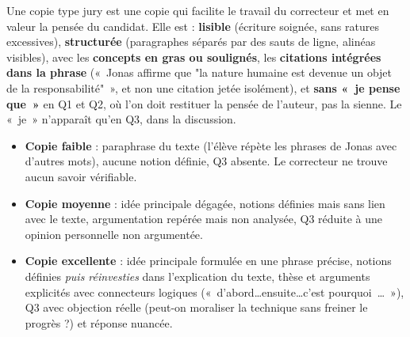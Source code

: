 \documentclass[11pt]{article}
\newcommand{\cle}[1]{{\popxbold\color{popdark}#1}}
\begin{document}
\begin{definition}
Une copie \cle{type jury} est une copie qui facilite le travail du correcteur et met en valeur la pensée du candidat. Elle est : \textbf{lisible} (écriture soignée, sans ratures excessives), \textbf{structurée} (paragraphes séparés par des sauts de ligne, alinéas visibles), avec les \textbf{concepts en gras ou soulignés}, les \textbf{citations intégrées dans la phrase} («~Jonas affirme que "la nature humaine est devenue un objet de la responsabilité"~», et non une citation jetée isolément), et \textbf{sans «~je pense que~»} en Q1 et Q2, où l'on doit restituer la pensée de l'auteur, pas la sienne. Le «~je~» n'apparaît qu'en Q3, dans la discussion.
\end{definition}

\begin{exemplebox}
\begin{itemize}
\item \textbf{Copie faible} : paraphrase du texte (l'élève répète les phrases de Jonas avec d'autres mots), aucune notion définie, Q3 absente. Le correcteur ne trouve aucun savoir vérifiable.
\item \textbf{Copie moyenne} : idée principale dégagée, notions définies mais sans lien avec le texte, argumentation repérée mais non analysée, Q3 réduite à une opinion personnelle non argumentée.
\item \textbf{Copie excellente} : idée principale formulée en une phrase précise, notions définies \emph{puis réinvesties} dans l'explication du texte, thèse et arguments explicités avec connecteurs logiques («~d'abord\dots ensuite\dots c'est pourquoi~\dots~»), Q3 avec objection réelle (peut-on moraliser la technique sans freiner le progrès ?) et réponse nuancée.
\end{itemize}
\end{exemplebox}
\end{document}
